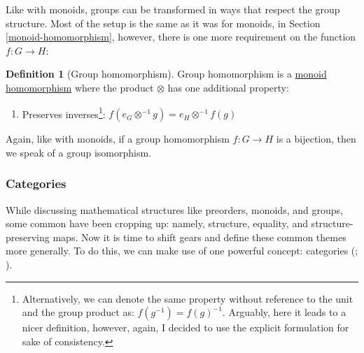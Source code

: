 \documentclass[
  openany]{book}
\providecommand{\tightlist}{%
  \setlength{\itemsep}{0pt}\setlength{\parskip}{0pt}}
\theoremstyle{definition}
\newtheorem{definition}{Definition}[chapter]
\theoremstyle{definition}
\theoremstyle{definition}
\theoremstyle{definition}
\theoremstyle{remark}
\begin{document}
Like with monoids, groups can be transformed in ways that respect the group structure. Most of the setup is the same as it was for monoids, in Section \ref{monoid-homomorphism}, however, there is one more requirement on the function \(f: G \to H\):

\begin{definition}[Group homomorphism]

Group homomorphism is a \hyperref[monoid-homomorphism]{monoid homomorphism} where the product \(\otimes\) has one additional property:

\begin{enumerate}
\def\labelenumi{\arabic{enumi}.}
\setcounter{enumi}{2}
\tightlist
\item
  Preserves inverses\footnote{Alternatively, we can denote the same property without reference to the unit and the group product as: \(f(g^{-1}) = f(g)^{-1}\). Arguably, here it leads to a nicer definition, however, again, I decided to use the explicit formulation for sake of consistency.}: \(f(e_G \otimes^{-1} g) = e_H \otimes^{-1}f(g)\)
\end{enumerate}

\end{definition}

Again, like with monoids, if a group homomorphism \(f: G \to H\) is a bijection, then we speak of a group isomorphism.

\subsubsection{Categories}\label{categories}

While discussing mathematical structures like preorders, monoids, and groups, some common have been cropping up: namely, structure, equality, and structure-preserving maps. Now it is time to shift gears and define these common themes more generally. To do this, we can make use of one powerful concept: categories (; ).
\end{document}
